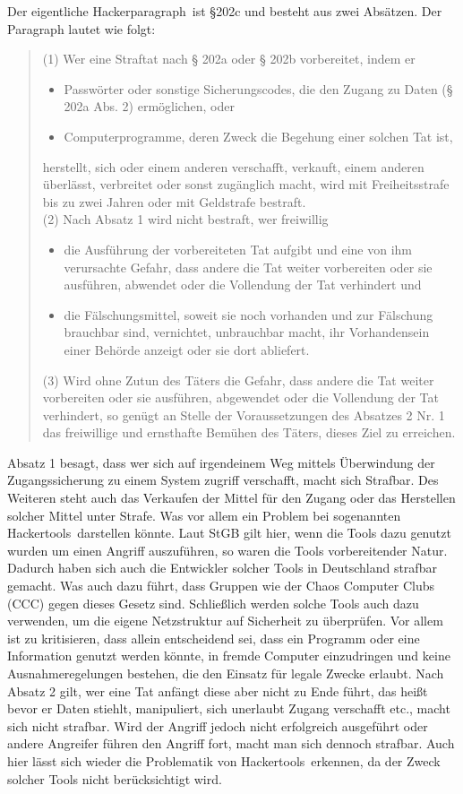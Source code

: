 \documentclass[10pt,a4paper]{article}
\begin{document}
Der eigentliche \glqq Hackerparagraph\grqq \ ist §202c und besteht aus zwei Absätzen. Der Paragraph lautet wie folgt:
\begin{quote}
(1) Wer eine Straftat nach § 202a oder § 202b vorbereitet, indem er 
\begin{itemize}
	\item[1.] Passwörter oder sonstige Sicherungscodes, die den Zugang zu Daten (§ 202a Abs. 2) ermöglichen, oder 
	\item[2.] Computerprogramme, deren Zweck die Begehung einer solchen Tat ist,
\end{itemize}
herstellt, sich oder einem anderen verschafft, verkauft, einem anderen überlässt, verbreitet oder sonst zugänglich macht, wird mit Freiheitsstrafe bis zu zwei Jahren oder mit Geldstrafe bestraft.\\
(2) Nach Absatz 1 wird nicht bestraft, wer freiwillig 
\begin{itemize}
	\item[1.] die Ausführung der vorbereiteten Tat aufgibt und eine von ihm verursachte Gefahr, dass andere die Tat weiter vorbereiten oder sie ausführen, abwendet oder die Vollendung der Tat verhindert und 
	\item[2.] die Fälschungsmittel, soweit sie noch vorhanden und zur Fälschung brauchbar sind, vernichtet, unbrauchbar macht, ihr Vorhandensein einer Behörde anzeigt oder sie dort abliefert.
\end{itemize}
(3) Wird ohne Zutun des Täters die Gefahr, dass andere die Tat weiter vorbereiten oder sie ausführen, abgewendet oder die Vollendung der Tat verhindert, so genügt an Stelle der Voraussetzungen des Absatzes 2 Nr. 1 das freiwillige und ernsthafte Bemühen des Täters, dieses Ziel zu erreichen.
\end{quote}
Absatz 1 besagt, dass wer sich auf irgendeinem Weg mittels Überwindung der Zugangssicherung zu einem System zugriff verschafft, macht sich Strafbar. Des Weiteren steht auch das Verkaufen der Mittel für den Zugang oder das Herstellen solcher Mittel unter Strafe. Was vor allem ein Problem bei sogenannten \glqq Hackertools\grqq \ darstellen könnte. Laut StGB gilt hier, wenn die Tools dazu genutzt wurden um einen Angriff auszuführen, so waren die Tools vorbereitender Natur. Dadurch haben sich auch die Entwickler solcher Tools in Deutschland strafbar gemacht. Was auch dazu führt, dass Gruppen wie der Chaos Computer Clubs (CCC) gegen dieses Gesetz sind. Schließlich werden solche Tools auch dazu verwenden, um die eigene Netzstruktur auf Sicherheit zu überprüfen. Vor allem ist zu kritisieren, dass allein entscheidend sei, dass ein Programm oder eine Information genutzt werden könnte, in fremde Computer einzudringen und keine Ausnahmeregelungen bestehen, die den Einsatz für legale Zwecke erlaubt.
Nach Absatz 2 gilt, wer eine Tat anfängt diese aber nicht zu Ende führt, das heißt bevor er Daten stiehlt, manipuliert, sich unerlaubt Zugang verschafft etc., macht sich nicht strafbar. Wird der Angriff jedoch nicht erfolgreich ausgeführt oder andere Angreifer führen den Angriff fort, macht man sich dennoch strafbar. Auch hier lässt sich wieder die Problematik von \glqq Hackertools\grqq \ erkennen, da der Zweck solcher Tools nicht berücksichtigt wird.
\end{document}
